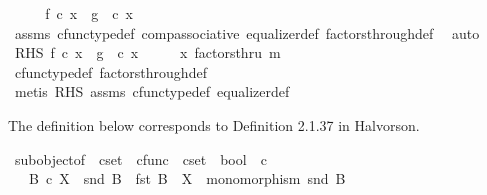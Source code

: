 \begin{isabellebody}
\ \ \isamarkupfalse%
\ \isamarkupfalse%
\ {\isachardoublequoteopen}f\ {\isasymcirc}\isactrlsub c\ x\ {\isacharequal}{\kern0pt}\ g\ \ {\isasymcirc}\isactrlsub c\ x{\isachardoublequoteclose}\isanewline
\ \ \ \ \isamarkupfalse%
\ assms{\isacharparenleft}{\kern0pt}{}{\isacharparenright}{\kern0pt}\ cfunc{\isacharunderscore}{\kern0pt}type{\isacharunderscore}{\kern0pt}def\ comp{\isacharunderscore}{\kern0pt}associative\ equalizer{\isacharunderscore}{\kern0pt}def\ factors{\isacharunderscore}{\kern0pt}through{\isacharunderscore}{\kern0pt}def\ \isamarkupfalse%
\ auto\isanewline
{}\isamarkupfalse%
\isanewline
\ \ \isamarkupfalse%
\ RHS{\isacharcolon}{\kern0pt}\ {\isachardoublequoteopen}f\ {\isasymcirc}\isactrlsub c\ x\ {\isacharequal}{\kern0pt}\ g\ \ {\isasymcirc}\isactrlsub c\ x{\isachardoublequoteclose}\isanewline
\ \ \isamarkupfalse%
\ \isamarkupfalse%
\ {\isachardoublequoteopen}x\ factorsthru\ m{\isachardoublequoteclose}\isanewline
\ \ \ \ \isamarkupfalse%
\ cfunc{\isacharunderscore}{\kern0pt}type{\isacharunderscore}{\kern0pt}def\ factors{\isacharunderscore}{\kern0pt}through{\isacharunderscore}{\kern0pt}def\isanewline
\ \ \ \ \isamarkupfalse%
\ {\isacharparenleft}{\kern0pt}metis\ RHS\ assms{\isacharparenleft}{\kern0pt}{}{\isacharcomma}{\kern0pt}{}{\isacharcomma}{\kern0pt}{}{\isacharparenright}{\kern0pt}\ cfunc{\isacharunderscore}{\kern0pt}type{\isacharunderscore}{\kern0pt}def\ equalizer{\isacharunderscore}{\kern0pt}def{\isacharparenright}{\kern0pt}\isanewline
{}\isamarkupfalse%
%
\endisatagproof
{\isafoldproof}%
%
\isadelimproof
%
\endisadelimproof
%
\begin{isamarkuptext}%
The definition below corresponds to Definition 2.1.37 in Halvorson.%
\end{isamarkuptext}\isamarkuptrue%
\isamarkupfalse%
\ subobject{\isacharunderscore}{\kern0pt}of\ {\isacharcolon}{\kern0pt}{\isacharcolon}{\kern0pt}\ {\isachardoublequoteopen}cset\ {\isasymtimes}\ cfunc\ {\isasymRightarrow}\ cset\ {\isasymRightarrow}\ bool{\isachardoublequoteclose}\ {\isacharparenleft}{\kern0pt}\ {\isachardoublequoteopen}{\isasymsubseteq}\isactrlsub c{\isachardoublequoteclose}\ {}{}{\isacharparenright}{\kern0pt}\isanewline
\ \ \ {\isachardoublequoteopen}B\ {\isasymsubseteq}\isactrlsub c\ X\ {\isasymlongleftrightarrow}\ {\isacharparenleft}{\kern0pt}snd\ B\ {\isacharcolon}{\kern0pt}\ fst\ B\ {\isasymrightarrow}\ X\ {\isasymand}\ monomorphism\ {\isacharparenleft}{\kern0pt}snd\ B{\isacharparenright}{\kern0pt}{\isacharparenright}{\kern0pt}{\isachardoublequoteclose}\isanewline

\end{isabellebody}

